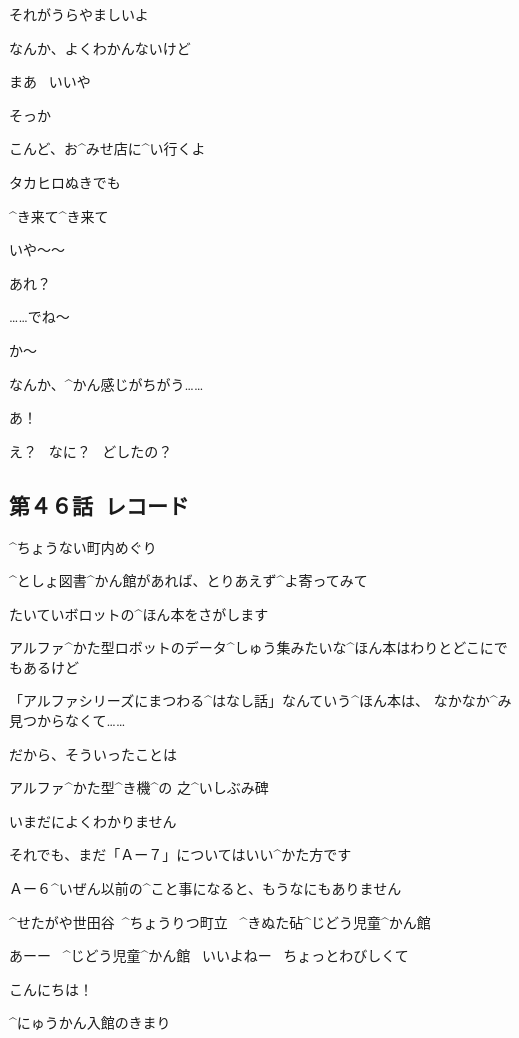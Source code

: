 \Alpha それがうらやましいよ

\Makki なんか、よくわかんないけど

\Makki まあ
\ いいや

\Alpha そっか

\Makki こんど、お^{みせ}{店}に^{い}{行}くよ

\Makki タカヒロぬきでも

\Alpha ^{き}{来}て^{き}{来}て

\page[40]
\Takahiro いや〜〜

\Takahiro あれ？

\Alpha ……でね〜

\Makki か〜

\Takahiro なんか、^{かん}{感}じがちがう……

\Alpha あ！

\Takahiro え？
\ なに？
\ どしたの？


\subsection{第４６話\ レコード}

\page[44]
\Kokone ^{ちょうない}{町内}めぐり

\Kokone ^{としょ}{図書}^{かん}{館}があれば、とりあえず^{よ}{寄}ってみて

\Kokone たいていボロットの^{ほん}{本}をさがします

\Kokone アルファ^{かた}{型}ロボットのデータ^{しゅう}{集}みたいな^{ほん}{本}はわりとどこにでもあるけど

\Kokone 「アルファシリーズにまつわる^{はなし}{話}」なんていう^{ほん}{本}は、
なかなか^{み}{見}つからなくて……

\page[45]
\Kokone だから、そういったことは

\Sign アルファ^{かた}{型}^{き}{機}^{の }{之}^{いしぶみ}{碑}

\Kokone いまだによくわかりません

\Kokone それでも、まだ「Ａー７」についてはいい^{かた}{方}です

\Kokone Ａー６^{いぜん}{以前}の^{こと}{事}になると、もうなにもありません

\page[46]
\Sign ^{せたがや}{世田谷}\ ^{ちょうりつ}{町立}
\ ^{きぬた}{砧}^{じどう}{児童}^{かん}{館}

\Kokone あーー
\ ^{じどう}{児童}^{かん}{館}
\ いいよねー
\ ちょっとわびしくて

\Kokone こんにちは！

\Sign ^{にゅうかん}{入館}のきまり

